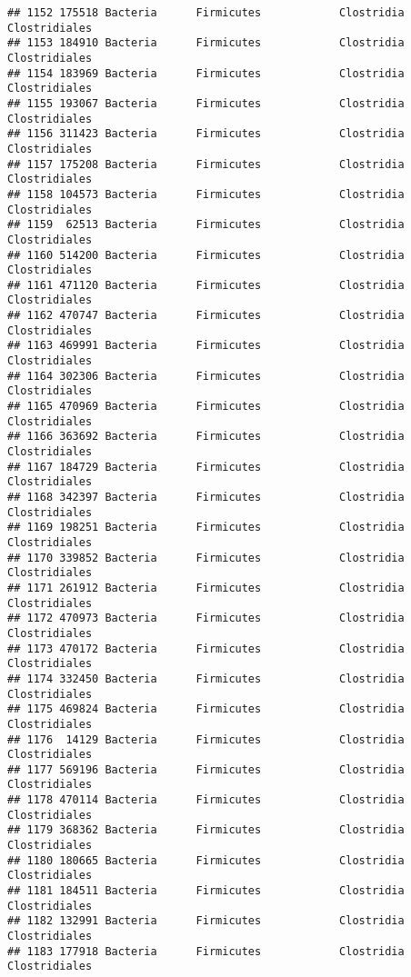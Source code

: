 \documentclass[
]{article}
\begin{document}
\begin{verbatim}
## 1152 175518 Bacteria      Firmicutes            Clostridia       Clostridiales
## 1153 184910 Bacteria      Firmicutes            Clostridia       Clostridiales
## 1154 183969 Bacteria      Firmicutes            Clostridia       Clostridiales
## 1155 193067 Bacteria      Firmicutes            Clostridia       Clostridiales
## 1156 311423 Bacteria      Firmicutes            Clostridia       Clostridiales
## 1157 175208 Bacteria      Firmicutes            Clostridia       Clostridiales
## 1158 104573 Bacteria      Firmicutes            Clostridia       Clostridiales
## 1159  62513 Bacteria      Firmicutes            Clostridia       Clostridiales
## 1160 514200 Bacteria      Firmicutes            Clostridia       Clostridiales
## 1161 471120 Bacteria      Firmicutes            Clostridia       Clostridiales
## 1162 470747 Bacteria      Firmicutes            Clostridia       Clostridiales
## 1163 469991 Bacteria      Firmicutes            Clostridia       Clostridiales
## 1164 302306 Bacteria      Firmicutes            Clostridia       Clostridiales
## 1165 470969 Bacteria      Firmicutes            Clostridia       Clostridiales
## 1166 363692 Bacteria      Firmicutes            Clostridia       Clostridiales
## 1167 184729 Bacteria      Firmicutes            Clostridia       Clostridiales
## 1168 342397 Bacteria      Firmicutes            Clostridia       Clostridiales
## 1169 198251 Bacteria      Firmicutes            Clostridia       Clostridiales
## 1170 339852 Bacteria      Firmicutes            Clostridia       Clostridiales
## 1171 261912 Bacteria      Firmicutes            Clostridia       Clostridiales
## 1172 470973 Bacteria      Firmicutes            Clostridia       Clostridiales
## 1173 470172 Bacteria      Firmicutes            Clostridia       Clostridiales
## 1174 332450 Bacteria      Firmicutes            Clostridia       Clostridiales
## 1175 469824 Bacteria      Firmicutes            Clostridia       Clostridiales
## 1176  14129 Bacteria      Firmicutes            Clostridia       Clostridiales
## 1177 569196 Bacteria      Firmicutes            Clostridia       Clostridiales
## 1178 470114 Bacteria      Firmicutes            Clostridia       Clostridiales
## 1179 368362 Bacteria      Firmicutes            Clostridia       Clostridiales
## 1180 180665 Bacteria      Firmicutes            Clostridia       Clostridiales
## 1181 184511 Bacteria      Firmicutes            Clostridia       Clostridiales
## 1182 132991 Bacteria      Firmicutes            Clostridia       Clostridiales
## 1183 177918 Bacteria      Firmicutes            Clostridia       Clostridiales

\end{verbatim}
\end{document}
